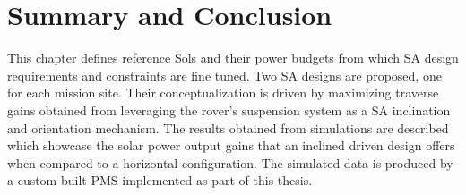 \section{Summary and Conclusion}
\label{sec:Design:SummaryAndConclusion}
This chapter defines reference Sols and their power budgets from which \ac{SA} design requirements and constraints are fine tuned. Two \ac{SA} designs are proposed, one for each mission site. Their conceptualization is driven by maximizing traverse gains obtained from leveraging the rover's suspension system as a \ac{SA} inclination and orientation mechanism. The results obtained from simulations are described which showcase the solar power output gains that an inclined driven design offers when compared to a horizontal configuration. The simulated data is produced by a custom built \ac{PMS} implemented as part of this thesis.
